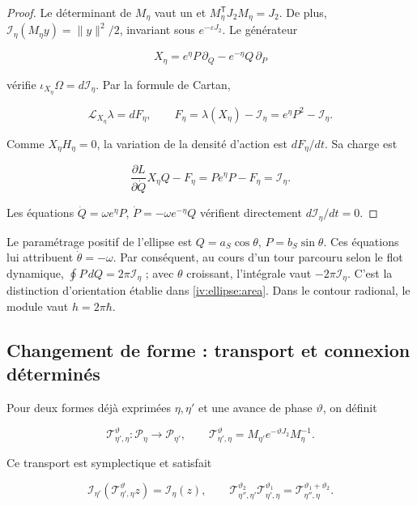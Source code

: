 \begin{proof}
Le déterminant de \(M_\eta\) vaut un et \(M_\eta^{\mathsf T}J_2M_\eta=J_2\). De plus,
\(\mathcal I_\eta(M_\eta y)=\|y\|^2/2\), invariant sous \(e^{-\varepsilon J_2}\).
Le générateur


\[
X_\eta=e^\eta P\,\partial_Q-e^{-\eta}Q\,\partial_P
\]

vérifie \(\iota_{X_\eta}\Omega=d\mathcal I_\eta\). Par la formule de Cartan,

\[
\mathcal L_{X_\eta}\lambda=dF_\eta,\qquad
F_\eta=\lambda(X_\eta)-\mathcal I_\eta=e^\eta P^2-\mathcal I_\eta.
\]

Comme \(X_\eta H_\eta=0\), la variation de la densité d’action est \(dF_\eta/dt\). Sa charge est

\[
\frac{\partial L}{\partial\dot Q}X_\eta Q-F_\eta
=Pe^\eta P-F_\eta=\mathcal I_\eta.
\]

Les équations \(\dot Q=\omega e^\eta P\), \(\dot P=-\omega e^{-\eta}Q\) vérifient directement \(d\mathcal I_\eta/dt=0\).
\end{proof}

Le paramétrage positif de l’ellipse est \(Q=a_S\cos\theta\), \(P=b_S\sin\theta\). Ces équations lui attribuent \(\dot\theta=-\omega\). Par conséquent, au cours d’un tour parcouru selon le flot dynamique, \(\oint P\,dQ=2\pi\mathcal I_\eta\) ; avec \(\theta\) croissant, l’intégrale vaut \(-2\pi\mathcal I_\eta\). C’est la distinction d’orientation établie dans \cref{iv:ellipse:area}. Dans le contour radional, le module vaut \(h=2\pi\hbar\).


\subsection{Changement de forme : transport et connexion déterminés}

Pour deux formes déjà exprimées \(\eta,\eta'\) et une avance de phase \(\vartheta\), on définit

\begin{equation}
\mathcal T_{\eta',\eta}^{\vartheta}:\mathcal P_\eta\to\mathcal P_{\eta'},
\qquad
\mathcal T_{\eta',\eta}^{\vartheta}
=M_{\eta'}e^{-\vartheta J_2}M_\eta^{-1}.
\label{nuc07:eq:4}
\end{equation}

\begin{proposition}
Ce transport est symplectique et satisfait

\begin{equation}
\mathcal I_{\eta'}(\mathcal T_{\eta',\eta}^{\vartheta}z)
=\mathcal I_\eta(z),\qquad
\mathcal T_{\eta'',\eta'}^{\vartheta_2}
\mathcal T_{\eta',\eta}^{\vartheta_1}
=\mathcal T_{\eta'',\eta}^{\vartheta_1+\vartheta_2}.
\label{nuc07:eq:5}
\end{equation}
\end{proposition}

